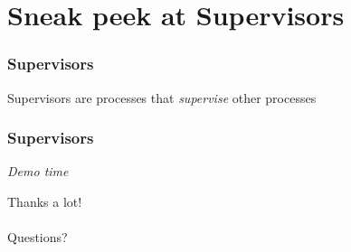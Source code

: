 \documentclass{beamer}
\begin{document}
\section{Sneak peek at Supervisors}
\begin{frame}
  \frametitle{Supervisors}
  \begin{center}
    Supervisors are processes that \textit{supervise} other processes
  \end{center}
\end{frame}

\begin{frame}
  \frametitle{Supervisors}
  \begin{center}
    \textit{Demo time}
  \end{center}
\end{frame}

\begin{frame}
  \centering
  \Large{Thanks a lot!}\\
  \hspace{0pt} \\
  \Large{Questions?}
\end{frame}
\end{document}
